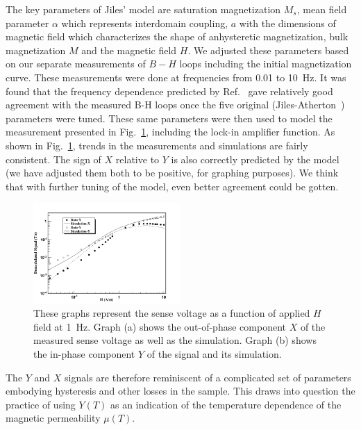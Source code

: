 The key parameters of Jiles' model are saturation magnetization $M_s$,
mean field parameter $\alpha$ which represents interdomain coupling,
$a$ with the dimensions of magnetic field which characterizes the
shape of anhysteretic magnetization, bulk magnetization $M$ and the
magnetic field $H$.  We adjusted these parameters based on our
separate measurements of $B-H$ loops including the initial
magnetization curve.  These measurements were done at frequencies from
0.01 to 10~Hz.  It was found that the frequency dependence predicted
by Ref.~\cite{bib:jiles} gave relatively good agreement with the
measured B-H loops once the five original
(Jiles-Atherton~\cite{bib:jiles}) parameters were tuned.  These same
parameters were then used to model the measurement presented in
Fig.~\ref{fig:data_and_simulation}, including the lock-in amplifier
function.  As shown in Fig.~\ref{fig:data_and_simulation}, trends in
the measurements and simulations are fairly consistent.  The sign of
$X$ relative to $Y$ is also correctly predicted by the model (we have
adjusted them both to be positive, for graphing purposes).  We think
that with further tuning of the model, even better agreement could be
gotten.

\begin{figure}[h!]
\begin{center}
   \includegraphics[width=0.5\textwidth]{data_and_simulation3.PNG}
    \caption{These graphs represent the sense voltage as a function of applied $H$ field at 1~Hz. Graph (a) shows the out-of-phase component $X$ of the measured sense voltage as well as the simulation. Graph (b) shows the in-phase component $Y$ of the signal and its simulation.}
    \label{fig:data_and_simulation}
    \end{center}
\end{figure} 


The $Y$ and $X$ signals are therefore reminiscent of a complicated set
of parameters embodying hysteresis and other losses in the sample.
This draws into question the practice of using $Y(T)$ as an indication
of the temperature dependence of the magnetic permeability $\mu(T)$.

